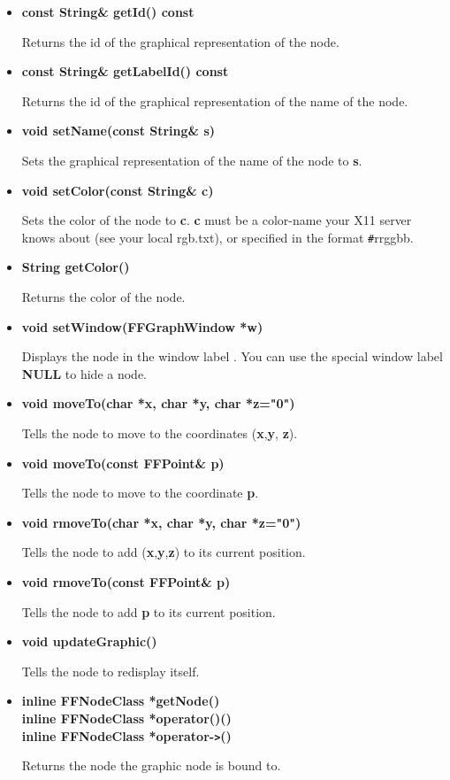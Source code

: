 \begin{itemize}
\item{\bf const String\& getId() const}

  Returns the id of the graphical representation of the node.

\item{\bf const String\& getLabelId() const}
  
  Returns the id of the graphical representation of the name of
  the node.

\item{\bf void setName(const String\& s)}
  
  Sets the graphical representation of the name of the node to
  {\bf s}.

\item{\bf void setColor(const String\& c)}
  
  Sets the color of the node to {\bf c}. {\bf c} must be a color-name your
  X11 server knows about (see your local rgb.txt), or specified in the
  format \verb|#|rrggbb.
  
\item{\bf String getColor()}

  Returns the color of the node.

\item{\bf void setWindow(FFGraphWindow *w)}

Displays the node in the window label {\bf }. You can use the special
window label {\bf NULL} to hide a node.

\item{\bf void moveTo(char *x, char *y, char *z="0")}
  
  Tells the node to move to the coordinates ({\bf x},{\bf y},
  {\bf z}).

\item{\bf void moveTo(const FFPoint\& p)}

  Tells the node to move to the coordinate {\bf p}.

\item{\bf void rmoveTo(char *x, char *y, char *z="0")}
  
  Tells the node to add ({\bf x},{\bf y},{\bf z}) to its current
  position.

\item{\bf void rmoveTo(const FFPoint\& p)}
  
  Tells the node to add {\bf p} to its current position.

\item{\bf void updateGraphic()}

  Tells the node to redisplay itself.

\item{\bf inline FFNodeClass *getNode() \\
 inline FFNodeClass *operator()() \\
 inline FFNodeClass *operator-\verb|>|()}

Returns the node the graphic node is bound to.

\end{itemize}

